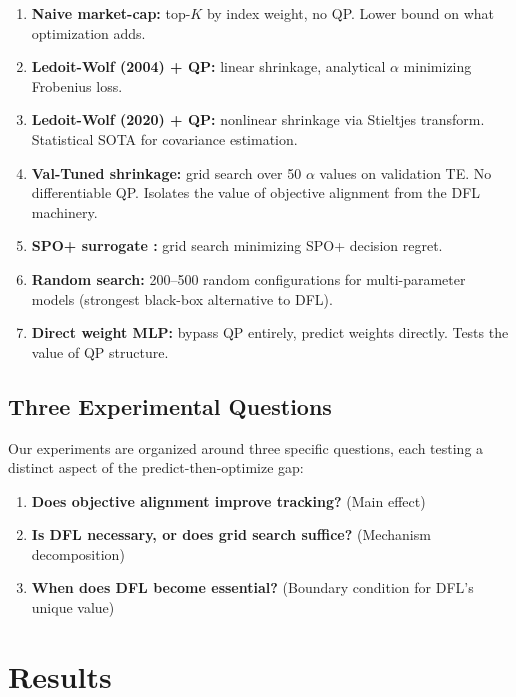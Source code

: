 \documentclass[11pt]{article}
\begin{document}
\begin{enumerate}[nosep]
  \item \textbf{Naive market-cap:} top-$K$ by index weight, no QP. Lower bound on what optimization adds.
  \item \textbf{Ledoit-Wolf (2004) + QP:} linear shrinkage, analytical $\alpha$ minimizing Frobenius loss.
  \item \textbf{Ledoit-Wolf (2020) + QP:} nonlinear shrinkage via Stieltjes transform. Statistical SOTA for covariance estimation.
  \item \textbf{Val-Tuned shrinkage:} grid search over 50 $\alpha$ values on validation TE. No differentiable QP. Isolates the value of objective alignment from the DFL machinery.
  \item \textbf{SPO+ surrogate \citep{elmachtoub2022smart}:} grid search minimizing SPO+ decision regret.
  \item \textbf{Random search:} 200--500 random configurations for multi-parameter models (strongest black-box alternative to DFL).
  \item \textbf{Direct weight MLP:} bypass QP entirely, predict weights directly. Tests the value of QP structure.
\end{enumerate}

\subsection{Three Experimental Questions}

Our experiments are organized around three specific questions, each testing a distinct aspect of the predict-then-optimize gap:

\begin{enumerate}[nosep]
  \item[\textbf{Q1.}] \textbf{Does objective alignment improve tracking?} (Main effect)
  \item[\textbf{Q2.}] \textbf{Is DFL necessary, or does grid search suffice?} (Mechanism decomposition)
  \item[\textbf{Q3.}] \textbf{When does DFL become essential?} (Boundary condition for DFL's unique value)
\end{enumerate}

\section{Results}
\label{sec:results}
\end{document}
